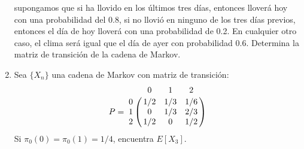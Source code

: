 \documentclass{report}
\begin{document}
\begin{enumerate}
supongamos que si ha llovido en los últimos tres días, entonces lloverá hoy con una probabilidad del 0.8, si no llovió en ninguno de los tres días previos, entonces el día de hoy lloverá con una probabilidad de 0.2. En cualquier otro caso, el clima será igual que el día de ayer con probabilidad 0.6. Determina la matriz de transición de la cadena de Markov.
\item Sea $\{X_n\}$ una cadena de Markov con matriz de transición:
$$
P = \bordermatrix{~ & 0   & 1   & 2 \cr
                  0 & 1/2 & 1/3 & 1/6 \cr
                  1 & 0   & 1/3 & 2/3 \cr
                  2 & 1/2 & 0   & 1/2 \cr             
                  }
$$
Si $\pi_0(0) = \pi_0(1)=1/4$, encuentra $E[X_3]$.
\end{enumerate}
\end{document}

